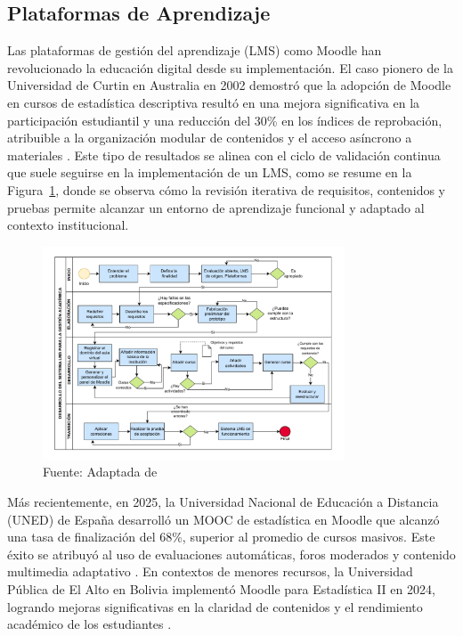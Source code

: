 \documentclass[letter,oneside,12pt,spanish]{report}
\begin{document}
\subsection{Plataformas de Aprendizaje}
Las plataformas de gestión del aprendizaje (LMS) como Moodle han revolucionado la educación digital desde su implementación. El caso pionero de la Universidad de Curtin en Australia en 2002 demostró que la adopción de Moodle en cursos de estadística descriptiva resultó en una mejora significativa en la participación estudiantil y una reducción del 30\% en los índices de reprobación, atribuible a la organización modular de contenidos y el acceso asíncrono a materiales \parencite{Pacheco2025}. Este tipo de resultados se alinea con el ciclo de validación continua que suele seguirse en la implementación de un LMS, como se resume en la Figura~\ref{fig:LMS}, donde se observa cómo la revisión iterativa de requisitos, contenidos y pruebas permite alcanzar un entorno de aprendizaje funcional y adaptado al contexto institucional.

\begin{figure}[ht]
    \centering
    \includegraphics[width=0.8\textwidth]{Figs/LMS.pdf}
    \label{fig:LMS}
    \\Fuente: Adaptada de \textcite{Pacheco2025}
\end{figure}

Más recientemente, en 2025, la Universidad Nacional de Educación a Distancia (UNED) de España desarrolló un MOOC de estadística en Moodle que alcanzó una tasa de finalización del 68\%, superior al promedio de cursos masivos. Este éxito se atribuyó al uso de evaluaciones automáticas, foros moderados y contenido multimedia adaptativo \parencite{Goh2025}. En contextos de menores recursos, la Universidad Pública de El Alto en Bolivia implementó Moodle para Estadística II en 2024, logrando mejoras significativas en la claridad de contenidos y el rendimiento académico de los estudiantes \parencite{Ndibalema2025}.
\end{document}
